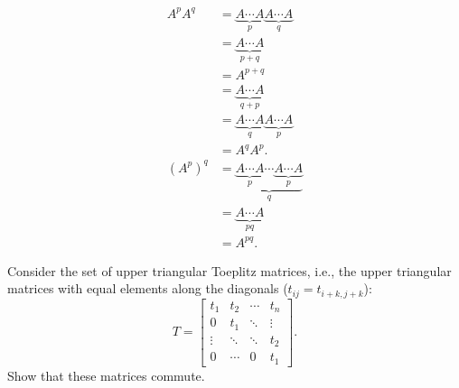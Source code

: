 \begin{solution}
  \begin{align*}
    A^pA^q
    & = \underbrace{A \cdots A}_{p} \underbrace{A \cdots A}_{q}\\
    & = \underbrace{A \cdots A}_{p+q}\\
    & = A^{p+q}\\
    & = \underbrace{A \cdots A}_{q+p}\\
    & = \underbrace{A \cdots A}_{q} \underbrace{A \cdots A}_{p}\\
    & = A^qA^p.\\
    (A^p)^q
    & = \underbrace{\underbrace{A \cdots A}_{p} \cdots \underbrace{A \cdots A}_{p}}_q\\
    & = \underbrace{A \cdots A}_{pq}\\
    & = A^{pq}.
  \end{align*}
\end{solution}

Consider the set of upper triangular Toeplitz matrices, i.e., the upper triangular matrices with equal elements
 along the diagonals ($t_{ij} = t_{i+k,j+k}$):
\[
  T =
  \begin{bmatrix}
    t_1 & t_2 & \cdots & t_n\\
    0   & t_1 & \ddots & \vdots\\
    \vdots & \ddots & \ddots & t_2\\
    0 & \cdots & 0 & t_1
  \end{bmatrix}.
\]
Show that these matrices commute.

